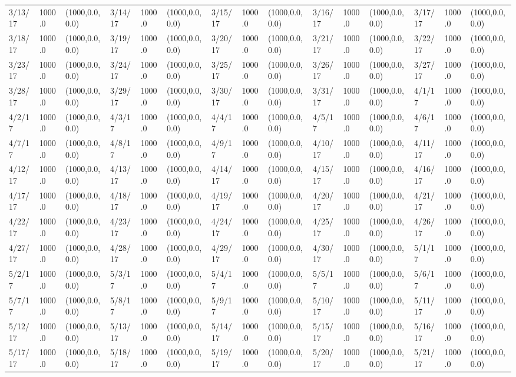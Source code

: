 \documentclass[12pt]{article}
\begin{document}
\begin{table}
\begin{center}
\begin{tabular}{p{15pt}p{15pt}p{25pt}p{15pt}p{15pt}p{25pt}p{15pt}p{15pt}p{25pt}p{15pt}p{15pt}p{25pt}p{15pt}p{15pt}p{25pt}}
    3/13/17&1000.0&(1000,0.0,0.0)&3/14/17&1000.0&(1000,0.0,0.0)&3/15/17&1000.0&(1000,0.0,0.0)&3/16/17&1000.0&(1000,0.0,0.0)&3/17/17&1000.0&(1000,0.0,0.0)\\
    3/18/17&1000.0&(1000,0.0,0.0)&3/19/17&1000.0&(1000,0.0,0.0)&3/20/17&1000.0&(1000,0.0,0.0)&3/21/17&1000.0&(1000,0.0,0.0)&3/22/17&1000.0&(1000,0.0,0.0)\\
    3/23/17&1000.0&(1000,0.0,0.0)&3/24/17&1000.0&(1000,0.0,0.0)&3/25/17&1000.0&(1000,0.0,0.0)&3/26/17&1000.0&(1000,0.0,0.0)&3/27/17&1000.0&(1000,0.0,0.0)\\
    3/28/17&1000.0&(1000,0.0,0.0)&3/29/17&1000.0&(1000,0.0,0.0)&3/30/17&1000.0&(1000,0.0,0.0)&3/31/17&1000.0&(1000,0.0,0.0)&4/1/17&1000.0&(1000,0.0,0.0)\\
    4/2/17&1000.0&(1000,0.0,0.0)&4/3/17&1000.0&(1000,0.0,0.0)&4/4/17&1000.0&(1000,0.0,0.0)&4/5/17&1000.0&(1000,0.0,0.0)&4/6/17&1000.0&(1000,0.0,0.0)\\
    4/7/17&1000.0&(1000,0.0,0.0)&4/8/17&1000.0&(1000,0.0,0.0)&4/9/17&1000.0&(1000,0.0,0.0)&4/10/17&1000.0&(1000,0.0,0.0)&4/11/17&1000.0&(1000,0.0,0.0)\\
    4/12/17&1000.0&(1000,0.0,0.0)&4/13/17&1000.0&(1000,0.0,0.0)&4/14/17&1000.0&(1000,0.0,0.0)&4/15/17&1000.0&(1000,0.0,0.0)&4/16/17&1000.0&(1000,0.0,0.0)\\
    4/17/17&1000.0&(1000,0.0,0.0)&4/18/17&1000.0&(1000,0.0,0.0)&4/19/17&1000.0&(1000,0.0,0.0)&4/20/17&1000.0&(1000,0.0,0.0)&4/21/17&1000.0&(1000,0.0,0.0)\\
    4/22/17&1000.0&(1000,0.0,0.0)&4/23/17&1000.0&(1000,0.0,0.0)&4/24/17&1000.0&(1000,0.0,0.0)&4/25/17&1000.0&(1000,0.0,0.0)&4/26/17&1000.0&(1000,0.0,0.0)\\
    4/27/17&1000.0&(1000,0.0,0.0)&4/28/17&1000.0&(1000,0.0,0.0)&4/29/17&1000.0&(1000,0.0,0.0)&4/30/17&1000.0&(1000,0.0,0.0)&5/1/17&1000.0&(1000,0.0,0.0)\\
    5/2/17&1000.0&(1000,0.0,0.0)&5/3/17&1000.0&(1000,0.0,0.0)&5/4/17&1000.0&(1000,0.0,0.0)&5/5/17&1000.0&(1000,0.0,0.0)&5/6/17&1000.0&(1000,0.0,0.0)\\
    5/7/17&1000.0&(1000,0.0,0.0)&5/8/17&1000.0&(1000,0.0,0.0)&5/9/17&1000.0&(1000,0.0,0.0)&5/10/17&1000.0&(1000,0.0,0.0)&5/11/17&1000.0&(1000,0.0,0.0)\\
    5/12/17&1000.0&(1000,0.0,0.0)&5/13/17&1000.0&(1000,0.0,0.0)&5/14/17&1000.0&(1000,0.0,0.0)&5/15/17&1000.0&(1000,0.0,0.0)&5/16/17&1000.0&(1000,0.0,0.0)\\
    5/17/17&1000.0&(1000,0.0,0.0)&5/18/17&1000.0&(1000,0.0,0.0)&5/19/17&1000.0&(1000,0.0,0.0)&5/20/17&1000.0&(1000,0.0,0.0)&5/21/17&1000.0&(1000,0.0,0.0)\\

\end{tabular}
\end{center}
\end{table}
\end{document}

